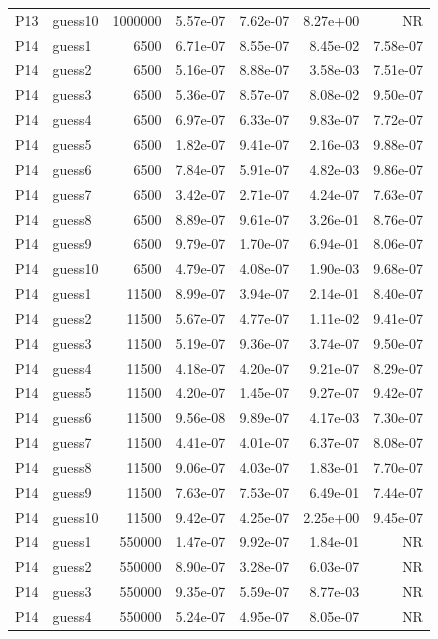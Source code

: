 {\begin{longtable}{llrrrrr}
P13 & guess10 & 1000000 & 5.57e-07 & 7.62e-07 & 8.27e+00 & NR \\
P14 & guess1 & 6500 & 6.71e-07 & 8.55e-07 & 8.45e-02 & 7.58e-07 \\
P14 & guess2 & 6500 & 5.16e-07 & 8.88e-07 & 3.58e-03 & 7.51e-07 \\
P14 & guess3 & 6500 & 5.36e-07 & 8.57e-07 & 8.08e-02 & 9.50e-07 \\
P14 & guess4 & 6500 & 6.97e-07 & 6.33e-07 & 9.83e-07 & 7.72e-07 \\
P14 & guess5 & 6500 & 1.82e-07 & 9.41e-07 & 2.16e-03 & 9.88e-07 \\
P14 & guess6 & 6500 & 7.84e-07 & 5.91e-07 & 4.82e-03 & 9.86e-07 \\
P14 & guess7 & 6500 & 3.42e-07 & 2.71e-07 & 4.24e-07 & 7.63e-07 \\
P14 & guess8 & 6500 & 8.89e-07 & 9.61e-07 & 3.26e-01 & 8.76e-07 \\
P14 & guess9 & 6500 & 9.79e-07 & 1.70e-07 & 6.94e-01 & 8.06e-07 \\
P14 & guess10 & 6500 & 4.79e-07 & 4.08e-07 & 1.90e-03 & 9.68e-07 \\
P14 & guess1 & 11500 & 8.99e-07 & 3.94e-07 & 2.14e-01 & 8.40e-07 \\
P14 & guess2 & 11500 & 5.67e-07 & 4.77e-07 & 1.11e-02 & 9.41e-07 \\
P14 & guess3 & 11500 & 5.19e-07 & 9.36e-07 & 3.74e-07 & 9.50e-07 \\
P14 & guess4 & 11500 & 4.18e-07 & 4.20e-07 & 9.21e-07 & 8.29e-07 \\
P14 & guess5 & 11500 & 4.20e-07 & 1.45e-07 & 9.27e-07 & 9.42e-07 \\
P14 & guess6 & 11500 & 9.56e-08 & 9.89e-07 & 4.17e-03 & 7.30e-07 \\
P14 & guess7 & 11500 & 4.41e-07 & 4.01e-07 & 6.37e-07 & 8.08e-07 \\
P14 & guess8 & 11500 & 9.06e-07 & 4.03e-07 & 1.83e-01 & 7.70e-07 \\
P14 & guess9 & 11500 & 7.63e-07 & 7.53e-07 & 6.49e-01 & 7.44e-07 \\
P14 & guess10 & 11500 & 9.42e-07 & 4.25e-07 & 2.25e+00 & 9.45e-07 \\
P14 & guess1 & 550000 & 1.47e-07 & 9.92e-07 & 1.84e-01 & NR \\
P14 & guess2 & 550000 & 8.90e-07 & 3.28e-07 & 6.03e-07 & NR \\
P14 & guess3 & 550000 & 9.35e-07 & 5.59e-07 & 8.77e-03 & NR \\
P14 & guess4 & 550000 & 5.24e-07 & 4.95e-07 & 8.05e-07 & NR \\

\end{longtable}}
